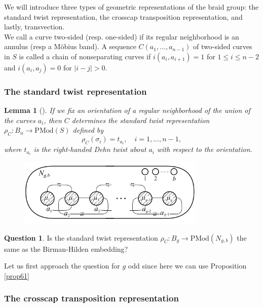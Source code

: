 \documentclass[reqno]{amsart}
\newtheorem{lemma}[theorem]{Lemma}
\theoremstyle{definition}
\newtheorem{question}[theorem]{Question}
\theoremstyle{remark}
\newcommand{\PMod}{{\mathrm{PMod}}}
\begin{document}
We will introduce three types of geometric representations
of the braid group: the standard twist representation, the crosscap
transposition representation, and lastly, transvection.\\


We call a curve two-sided (resp. one-sided) if its regular neighborhood is an
annulus (resp a Möbius band). A sequence
$C \left( a_1, \ldots, a_{n-1} \right) $ of two-sided
curves in $S$ is called a chain of nonseparating curves
if $i \left( a_i, a_{i+1} \right) =1$ for
$1 \le i \le n-2$ and
$i \left( a_i, a_j \right) =0$ for $\left| i-j \right| >0$.

\subsubsection{The standard twist representation}

\begin{lemma}[]
    If we fix an orientation of a regular neighborhood
    of the union of the curves $a_i$, then
    $C$ determines \textit{the standard twist representation}
    $\rho_{C} \colon B_n \to \PMod (S)$ defined by
    \[
    \rho_C \left( \sigma_i \right) = t_{a_i}, \quad
    i = 1, \ldots, n-1,
    \] 
    where $t_{a_i}$ is the right-handed Dehn twist
    about $a_i$ with respect to the orientation.
\end{lemma}

\begin{figure}[H]
    \centering
    \includegraphics[width=0.8\textwidth]{standard-chain.png}
    \label{fig:standard-chain-png}
\end{figure}

\begin{question}
    Is the standard twist representation
    $\rho_{C} \colon B_g \to \PMod (N_{g,b})$ the
    same as the Birman-Hilden embedding?
\end{question}

Let us first approach the question for
$g$ odd since here
we can use Proposition \ref{prop61}



\subsubsection{The crosscap transposition representation}
\end{document}
